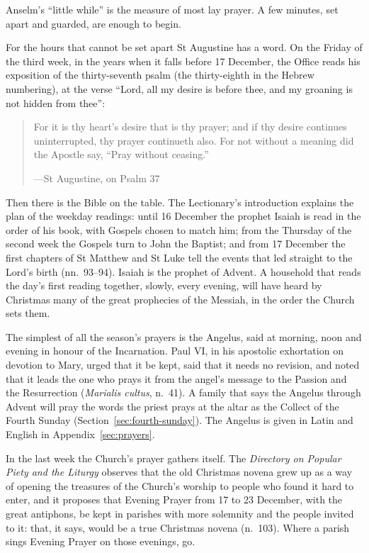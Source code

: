 \noindent Anselm's ``little while'' is the measure of most lay prayer. A few
minutes, set apart and guarded, are enough to begin.

For the hours that cannot be set apart St Augustine has a word. On the Friday of
the third week, in the years when it falls before 17 December, the Office reads
his exposition of the thirty-seventh psalm (the thirty-eighth in the
Hebrew numbering), at the verse ``Lord, all my desire is before thee, and
my groaning is not hidden from thee'':

\begin{quote}
For it is thy heart's desire that is thy prayer; and if thy desire continues
uninterrupted, thy prayer continueth also. For not without a meaning did the
Apostle say, ``Pray without ceasing.''\par
{\smallskip\noindent\small ---St Augustine, on Psalm 37\par}
\end{quote}

Then there is the Bible on the table. The Lectionary's introduction explains
the plan of the weekday readings: until 16 December the prophet Isaiah is read
in the order of his book, with Gospels chosen to match him; from the Thursday of
the second week the Gospels turn to John the Baptist; and from 17 December the
first chapters of St Matthew and St Luke tell the events that led straight to
the Lord's birth (nn.~93--94). Isaiah is the prophet of Advent. A household that
reads the day's first reading together, slowly, every evening, will have heard by
Christmas many of the great prophecies of the Messiah, in the order the Church
sets them.

The simplest of all the season's prayers is the Angelus, said at morning, noon
and evening in honour of the Incarnation. Paul VI, in his apostolic exhortation
on devotion to Mary, urged that it be kept, said that it needs no revision, and
noted that it leads the one who prays it from the angel's message to the Passion
and the Resurrection (\emph{Marialis cultus}, n.~41). A family that says the
Angelus through Advent will pray the words the priest prays at the altar as the
Collect of the Fourth Sunday (Section~\ref{sec:fourth-sunday}). The Angelus is
given in Latin and English in Appendix~\ref{sec:prayers}.

In the last week the Church's prayer gathers itself. The \emph{Directory on
Popular Piety and the Liturgy} observes that the old Christmas novena grew up as
a way of opening the treasures of the Church's worship to people who found it
hard to enter, and it proposes that Evening Prayer from 17 to 23 December, with
the great antiphons, be kept in parishes with more solemnity and the people
invited to it: that, it says, would be a true Christmas novena (n.~103). Where a parish sings Evening Prayer on those evenings, go.
